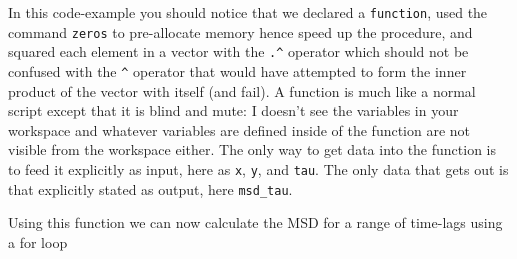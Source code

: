 In this code-example you should notice that we declared a \lstinline{function}, used the command \lstinline{zeros} to pre-allocate memory hence speed up the procedure, and squared each element in a vector with the \lstinline{.^} operator which should not be confused with the \lstinline{^} operator that would have attempted to form the inner product of the vector with itself (and fail).
A function is much like a normal script except that it is blind and mute: I doesn't see the variables in your workspace and whatever variables are defined inside of the function are not visible from the workspace either.  The only way to get data into the function is to feed it explicitly as input, here as \lstinline{x}, \lstinline{y}, and \lstinline{tau}. The only data that gets out is that explicitly stated as output, here \lstinline{msd_tau}.

Using this function we can now calculate the MSD for a range of time-lags using a for loop